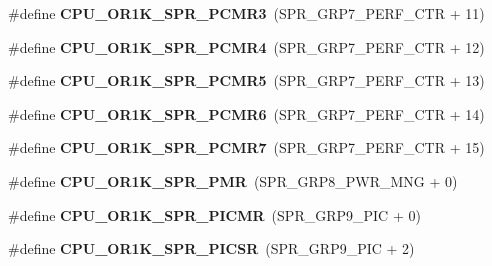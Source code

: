 \begin{DoxyCompactItemize}
\item 
\mbox{\label{or1k-utility_8h_a735357ccaf012e85eda1d50fc774f90d}} 
\#define {\bfseries C\+P\+U\+\_\+\+O\+R1\+K\+\_\+\+S\+P\+R\+\_\+\+P\+C\+M\+R3}~(S\+P\+R\+\_\+\+G\+R\+P7\+\_\+\+P\+E\+R\+F\+\_\+\+C\+TR + 11)
\item 
\mbox{\label{or1k-utility_8h_a37fe3712332e479ab1827de55ff6d582}} 
\#define {\bfseries C\+P\+U\+\_\+\+O\+R1\+K\+\_\+\+S\+P\+R\+\_\+\+P\+C\+M\+R4}~(S\+P\+R\+\_\+\+G\+R\+P7\+\_\+\+P\+E\+R\+F\+\_\+\+C\+TR + 12)
\item 
\mbox{\label{or1k-utility_8h_ab5a0062d6f10daa7a5aa8d21f2c4a8af}} 
\#define {\bfseries C\+P\+U\+\_\+\+O\+R1\+K\+\_\+\+S\+P\+R\+\_\+\+P\+C\+M\+R5}~(S\+P\+R\+\_\+\+G\+R\+P7\+\_\+\+P\+E\+R\+F\+\_\+\+C\+TR + 13)
\item 
\mbox{\label{or1k-utility_8h_a67616ff99b028283500efd2f41a50a26}} 
\#define {\bfseries C\+P\+U\+\_\+\+O\+R1\+K\+\_\+\+S\+P\+R\+\_\+\+P\+C\+M\+R6}~(S\+P\+R\+\_\+\+G\+R\+P7\+\_\+\+P\+E\+R\+F\+\_\+\+C\+TR + 14)
\item 
\mbox{\label{or1k-utility_8h_a843251e7cc7edebdb4df0a30673c1d46}} 
\#define {\bfseries C\+P\+U\+\_\+\+O\+R1\+K\+\_\+\+S\+P\+R\+\_\+\+P\+C\+M\+R7}~(S\+P\+R\+\_\+\+G\+R\+P7\+\_\+\+P\+E\+R\+F\+\_\+\+C\+TR + 15)
\item 
\mbox{\label{or1k-utility_8h_a983c137e57d099a883a84fd892cbeb8e}} 
\#define {\bfseries C\+P\+U\+\_\+\+O\+R1\+K\+\_\+\+S\+P\+R\+\_\+\+P\+MR}~(S\+P\+R\+\_\+\+G\+R\+P8\+\_\+\+P\+W\+R\+\_\+\+M\+NG + 0)
\item 
\mbox{\label{or1k-utility_8h_af574cc71bb05939aa35bf9b137271622}} 
\#define {\bfseries C\+P\+U\+\_\+\+O\+R1\+K\+\_\+\+S\+P\+R\+\_\+\+P\+I\+C\+MR}~(S\+P\+R\+\_\+\+G\+R\+P9\+\_\+\+P\+IC + 0)
\item 
\mbox{\label{or1k-utility_8h_a4bf82c6732ad34a6c2986affb4bd17c6}} 
\#define {\bfseries C\+P\+U\+\_\+\+O\+R1\+K\+\_\+\+S\+P\+R\+\_\+\+P\+I\+C\+SR}~(S\+P\+R\+\_\+\+G\+R\+P9\+\_\+\+P\+IC + 2)
\item 
\mbox{\label{or1k-utility_8h_a14c3497526d0809162fd428065bce7c3}} 

\end{DoxyCompactItemize}
